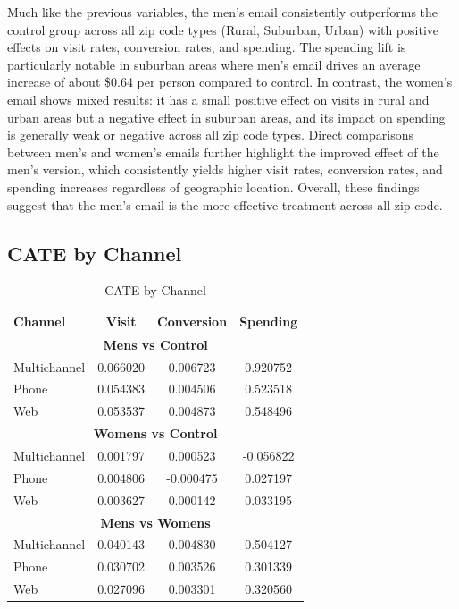 \documentclass[10pt]{article}
\begin{document}
Much like the previous variables, the men’s email consistently outperforms the control group across all zip code types (Rural, Suburban, Urban) with positive effects on visit rates, conversion rates, and spending. The spending lift is particularly notable in suburban areas where men’s email drives an average increase of about \$0.64 per person compared to control. In contrast, the women’s email shows mixed results: it has a small positive effect on visits in rural and urban areas but a negative effect in suburban areas, and its impact on spending is generally weak or negative across all zip code types. Direct comparisons between men’s and women’s emails further highlight the improved effect of the men’s version, which consistently yields higher visit rates, conversion rates, and spending increases regardless of geographic location. Overall, these findings suggest that the men’s email is the more effective treatment across all zip code.

\subsection{CATE by Channel}

\begin{table}[H]
\centering
\caption{CATE by Channel}
\begin{tabular}{lccc}
\toprule
\textbf{Channel} & \textbf{Visit} & \textbf{Conversion} & \textbf{Spending} \\
\midrule
\multicolumn{4}{c}{\textbf{Mens vs Control}} \\
\midrule
Multichannel & 0.066020 & 0.006723 & 0.920752 \\
Phone        & 0.054383 & 0.004506 & 0.523518 \\
Web          & 0.053537 & 0.004873 & 0.548496 \\
\midrule
\multicolumn{4}{c}{\textbf{Womens vs Control}} \\
\midrule
Multichannel & 0.001797 & 0.000523  & -0.056822 \\
Phone        & 0.004806 & -0.000475 & 0.027197  \\
Web          & 0.003627 & 0.000142  & 0.033195  \\
\midrule
\multicolumn{4}{c}{\textbf{Mens vs Womens}} \\
\midrule
Multichannel & 0.040143 & 0.004830 & 0.504127 \\
Phone        & 0.030702 & 0.003526 & 0.301339 \\
Web          & 0.027096 & 0.003301 & 0.320560 \\
\bottomrule
\end{tabular}
\end{table}
\end{document}
